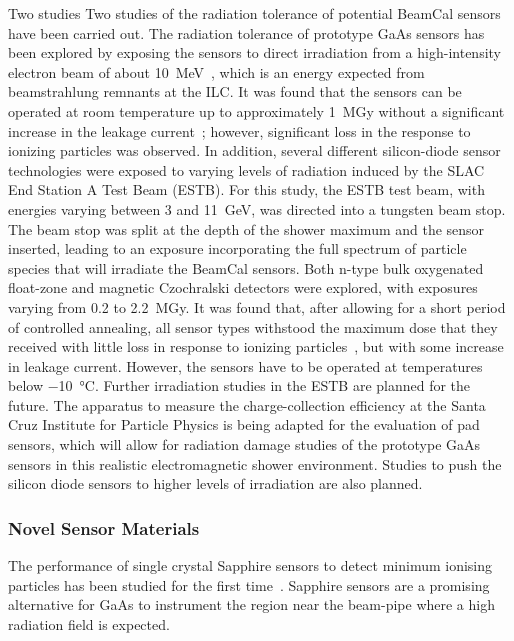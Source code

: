 Two studies Two studies of the radiation tolerance of potential BeamCal sensors have been carried out. The
radiation tolerance of prototype GaAs sensors has been explored by exposing the sensors
to direct irradiation from a high-intensity electron beam of about \SI{10}{MeV}~\cite{sdalinac},
which is an energy expected from beamstrahlung
remnants at the ILC.
It was found that the sensors can be operated at room temperature up
to approximately \SI{1}{MGy} without a significant increase in the
leakage current~\cite{1748-0221-7-11-P11022}; however, significant loss in the response to ionizing particles was observed.
In addition, several different silicon-diode sensor technologies were exposed to varying levels
of radiation induced by the SLAC End Station A Test Beam (ESTB).
For this study, the ESTB test beam, with energies
varying between 3 and \SI{11}{GeV}, was directed into a tungsten beam stop.
The beam stop was split at the depth of the shower maximum
and the sensor inserted,
leading to an exposure incorporating the full spectrum of particle species that will
irradiate the BeamCal sensors. Both n-type bulk oxygenated float-zone and magnetic Czochralski
detectors were explored, with exposures varying from 0.2 to \SI{2.2}{MGy}.
It was found that, after allowing for a short period of controlled annealing,
all sensor types withstood the maximum dose that they received with little loss in response
to ionizing particles~\cite{2014arXiv1402.2692B}, but with some increase in leakage current.
However, the sensors have to be operated at temperatures below \SI{-10}{\degreeCelsius}.
Further irradiation studies in the ESTB are planned for the future.
The apparatus to measure the charge-collection efficiency  at the Santa Cruz Institute
for Particle Physics is being adapted for the evaluation of pad sensors, which will allow for radiation
damage studies of the prototype GaAs sensors in this realistic electromagnetic shower environment.
Studies to push the silicon diode sensors to higher levels of irradiation are also planned.

\subsubsection{Novel Sensor Materials}

The performance of single crystal Sapphire sensors to detect minimum ionising particles has been studied for the
first time~\cite{1748-0221-10-08-P08008}. Sapphire sensors are a promising alternative for GaAs to instrument
the region near the beam-pipe where a high radiation field is expected.

